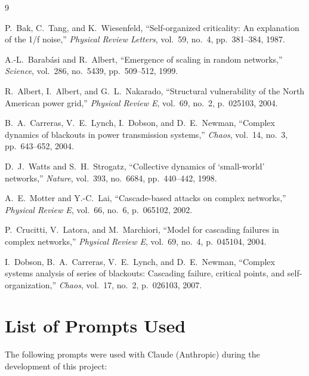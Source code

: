 \documentclass[12pt,a4paper]{article}
\begin{document}

\begin{thebibliography}{9}

P.~Bak, C.~Tang, and K.~Wiesenfeld,
``Self-organized criticality: An explanation of the 1/f noise,''
\textit{Physical Review Letters}, vol.~59, no.~4, pp.~381--384, 1987.

A.-L.~Barab{\'a}si and R.~Albert,
``Emergence of scaling in random networks,''
\textit{Science}, vol.~286, no.~5439, pp.~509--512, 1999.

R.~Albert, I.~Albert, and G.~L.~Nakarado,
``Structural vulnerability of the North American power grid,''
\textit{Physical Review E}, vol.~69, no.~2, p.~025103, 2004.

B.~A.~Carreras, V.~E.~Lynch, I.~Dobson, and D.~E.~Newman,
``Complex dynamics of blackouts in power transmission systems,''
\textit{Chaos}, vol.~14, no.~3, pp.~643--652, 2004.

D.~J.~Watts and S.~H.~Strogatz,
``Collective dynamics of `small-world' networks,''
\textit{Nature}, vol.~393, no.~6684, pp.~440--442, 1998.

A.~E.~Motter and Y.-C.~Lai,
``Cascade-based attacks on complex networks,''
\textit{Physical Review E}, vol.~66, no.~6, p.~065102, 2002.

P.~Crucitti, V.~Latora, and M.~Marchiori,
``Model for cascading failures in complex networks,''
\textit{Physical Review E}, vol.~69, no.~4, p.~045104, 2004.

I.~Dobson, B.~A.~Carreras, V.~E.~Lynch, and D.~E.~Newman,
``Complex systems analysis of series of blackouts: Cascading failure, critical points, and self-organization,''
\textit{Chaos}, vol.~17, no.~2, p.~026103, 2007.

\end{thebibliography}


\appendix
\section{List of Prompts Used}
\label{sec:prompts}

The following prompts were used with Claude (Anthropic) during the development of this project:
\end{document}
